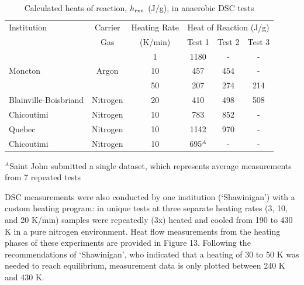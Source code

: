 \documentclass{book}
\begin{document}
\begin{table}[ht]
\caption{Calculated heats of reaction, $h_{\rm rxn}$ (J/g), in anaerobic DSC tests}
\label{Table_11}
\begin{center}
\begin{tabular}{|l|c|c|ccc|}
\hline
Institution           & Carrier     & Heating Rate         & \multicolumn{3}{|c|}{Heat of Reaction (J/g)} \\ \cline{4-6}
                      & Gas         & (K/min)              & Test 1  & Test 2  & Test 3                 \\ \hline
                      &             & 1                    & 1180    & -       & -                      \\
Moncton               & Argon       & 10                   & 457     & 454     & -                      \\
                      &             & 50                   & 207     & 274     & 214                    \\ \hline
Blainville-Boisbriand & Nitrogen    & 20                   & 410     & 498     & 508                    \\ \hline
Chicoutimi            & Nitrogen    & 10                   & 783     & 852     & -                      \\ \hline
Quebec                & Nitrogen    & 10                   & 1142    & 970     & -                      \\ \hline
Chicoutimi            & Nitrogen    & 10                   & 695$^A$ & -       & -                      \\ \hline
\end{tabular}
\end{center}
$^A$Saint John submitted a single dataset, which represents average measurements from 7 repeated tests
\end{table}

DSC measurements were also conducted by one institution (‘Shawinigan’) with a custom heating program: in unique tests at three separate heating rates (3, 10, and 20 K/min) samples were repeatedly (3x) heated and cooled from 190 to 430 K in a pure nitrogen environment. Heat flow measurements from the heating phases of these experiments are provided in Figure 13. Following the recommendations of ‘Shawinigan’, who indicated that a heating of 30 to 50 K was needed to reach equilibrium, measurement data is only plotted between 240 K and 430 K.
\end{document}
